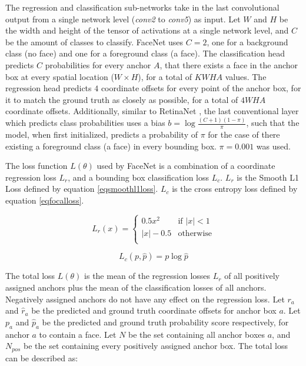 \documentclass[a4paper, twoside]{article}
\begin{document}
The regression and classification sub-networks take in the last convolutional output from a single network level (\textit{conv2} to \textit{conv5}) as input. Let $W$ and $H$ be the width and height of the tensor of activations at a single network level, and $C$ be the amount of classes to classify. FaceNet uses $C=2$, one for a background class (no face) and one for a foreground class (a face). The classification head predicts $C$ probabilities for every anchor $A$, that there exists a face in the anchor box at every spatial location ($W \times H$), for a total of $KWHA$ values. The regression head predicts $4$ coordinate offsets for every point of the anchor box, for it to match the ground truth as closely as possible, for a total of $4WHA$ coordinate offsets. Additionally, similar to RetinaNet \cite{retinanet}, the last conventional layer which predicts class probabilities uses a bias $b = \log{\frac{(C+1)(1-\pi)}{\pi}}$, such that the model, when first initialized, predicts a probability of $\pi$ for the case of there existing a foreground class (a face) in every bounding box. $\pi = 0.001$ was used.



The loss function $L(\theta)$ used by FaceNet is a combination of a coordinate regression loss $L_r$, and a bounding box classification loss $L_c$. $L_r$ is the Smooth L1 Loss \cite{cs231n} defined by equation \eqref{eqsmoothl1loss}. $L_c$ is the cross entropy loss \cite{cs231n} defined by equation \eqref{eqfocalloss}.

\begin{equation}\label{eqfocalloss}
L_r(x) = \begin{cases}
				0.5x^2 & \mbox{if } |x| < 1\\
				|x| - 0.5 & \mbox{otherwise}\\
			\end{cases}
\end{equation}

\begin{equation}\label{eqsmoothl1loss}
L_c(p, \hat{p}) = p \log{\hat{p}}
\end{equation}

The total loss $L(\theta)$ is the mean of the regression losses $L_r$ of all positively assigned anchors plus the mean of the classification losses of all anchors. Negatively assigned anchors do not have any effect on the regression loss. Let $r_a$ and $\hat{r}_a$ be the predicted and ground truth coordinate offsets for anchor box $a$. Let $p_a$ and $\hat{p}_a$ be the predicted and ground truth probability score respectively, for anchor $a$ to contain a face. Let $N$ be the set containing all anchor boxes $a$, and $N_{pos}$ be the set containing every positively assigned anchor box. The total loss can be described as:
\end{document}
